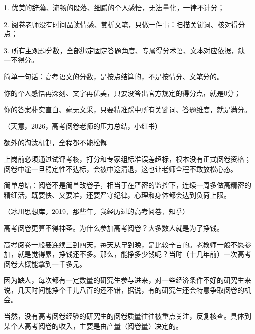 \documentclass[12pt,a4paper]{article}
\begin{document}
1. 优美的辞藻、流畅的段落、细腻的个人感悟，无法量化，一律不计分；



2. 阅卷老师没有时间品读情感、赏析文笔，只做一件事：扫描关键词、核对得分点；



3. 所有主观题分数，全部绑定固定答题角度、专属得分术语、文本对应依据，缺一不得分。





简单一句话：高考语文的分数，是按点结算的，不是按情分、文笔分的。





你的个人感悟再深刻、文字再优美，只要没答出官方规定的得分点，就是0分；



你的答案朴实直白、毫无文采，只要精准踩中所有关键词、答题维度，就是满分。



{\color{gray}\small （天意，2026，高考阅卷老师的压力总结，小红书）}



额外的淘汰机制，全程都不能松懈

上岗前必须通过试评考核，打分和专家组标准误差超标，根本没有正式阅卷资格；阅卷中途一旦稳定性不达标，会被中途清退，这也让老师全程不敢放松心态。

简单总结：阅卷不是简单改卷子，相当于在严密的监控下，连续一周多做高精密的精细活，既要快、又要准，还要严守纪律，心理和身体都会达到负荷上限。



{\color{gray}\small （冰川思想库，2019，那些年，我经历过的高考阅卷，知乎）}



高考阅卷更算不得神圣。为什么参加高考阅卷？大多数人就是为了挣钱。





高考阅卷一般要连续三到四天，每天从早到晚，是比较辛苦的。老教师一般不愿参加，就是觉得累，挣钱还不多。那么，能挣多少钱呢？当时（十几年前）一次高考阅卷大概能拿到一千多元。





因为缺人，每次都有一定数量的研究生参与进来，对一些经济条件不好的研究生来说，几天时间能挣个千儿八百的还不错，据说，有的研究生还会特意争取阅卷的机会。





当然，没有高考阅卷经验的研究生的阅卷质量往往被重点关注，反复核查。具体到某个人高考阅卷的收入，主要是由产量（阅卷量）决定的。
\end{document}
